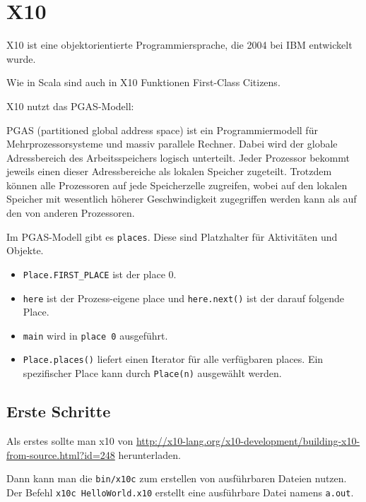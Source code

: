 \chapter{X10}%
X10 ist eine objektorientierte Programmiersprache, die 2004 bei IBM entwickelt
wurde.

Wie in Scala sind auch in X10 Funktionen First-Class Citizens.

X10 nutzt das PGAS-Modell:

\begin{definition}%
    PGAS (partitioned global address space) ist ein Programmiermodell für 
    Mehrprozessorsysteme und massiv parallele Rechner. Dabei wird der globale 
    Adressbereich des Arbeitsspeichers logisch unterteilt. Jeder Prozessor 
    bekommt jeweils einen dieser Adressbereiche als lokalen Speicher zugeteilt. 
    Trotzdem können alle Prozessoren auf jede Speicherzelle zugreifen, wobei auf 
    den lokalen Speicher mit wesentlich höherer Geschwindigkeit zugegriffen 
    werden kann als auf den von anderen Prozessoren.
\end{definition}

Im PGAS-Modell gibt es \texttt{places}. Diese sind Platzhalter für Aktivitäten
und Objekte.

\begin{itemize}
    \item \texttt{Place.FIRST\_PLACE} ist der place 0.
    \item \texttt{here} ist der Prozess-eigene place und \texttt{here.next()} ist
          der darauf folgende Place.
    \item \texttt{main} wird in \texttt{place 0} ausgeführt.
    \item \texttt{Place.places()} liefert einen Iterator für alle verfügbaren places.
          Ein spezifischer Place kann durch \texttt{Place(n)} ausgewählt werden.
\end{itemize}

\section{Erste Schritte}
Als erstes sollte man x10 von \url{http://x10-lang.org/x10-development/building-x10-from-source.html?id=248} herunterladen.

Dann kann man die \texttt{bin/x10c} zum erstellen von ausführbaren Dateien nutzen.
Der Befehl \texttt{x10c HelloWorld.x10} erstellt eine ausführbare Datei namens
\texttt{a.out}.

